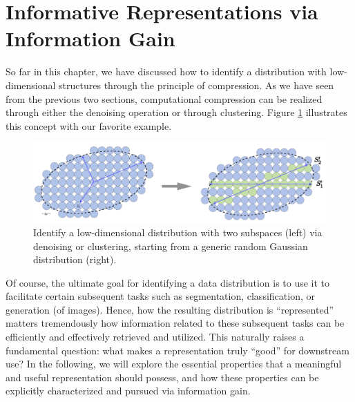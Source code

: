 \documentclass[../../book-main.tex]{subfiles}
\begin{document}
\section{Informative Representations via Information Gain}
\label{sec:chap4-representation-learning-problem}




So far in this chapter, we have discussed how to identify a distribution with low-dimensional structures through the principle of compression. As we have seen from the previous two sections, computational compression can be realized through either the denoising operation or through clustering. Figure \ref{fig:Gaussian-Subspaces} illustrates this concept with our favorite example.
\begin{figure}[t]
    \centering
    \includegraphics[width=0.8\linewidth]{chapters/chapter3/figs/Gaussian-Subspaces.png}
    \caption{Identify a low-dimensional distribution with two subspaces (left) via denoising or clustering, starting from a generic random Gaussian distribution (right).}
    \label{fig:Gaussian-Subspaces}
\end{figure}
Of course, the ultimate goal for identifying a data distribution is to use it to facilitate certain subsequent tasks such as segmentation, classification, or generation (of images). Hence, how the resulting distribution is ``represented'' matters tremendously how information related to these subsequent tasks can be efficiently and effectively retrieved and utilized. This naturally raises a fundamental question: what makes a representation truly ``good'' for downstream use? In the following, we will explore the essential properties that a meaningful and useful representation should possess, and how these properties can be explicitly characterized and pursued via information gain.  

\end{document}
